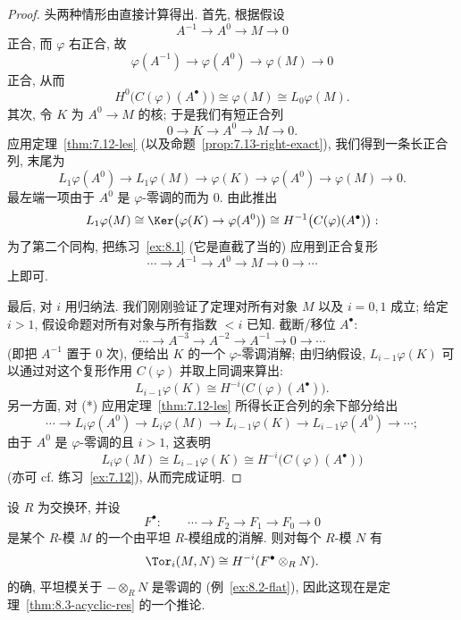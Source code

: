 \begin{proof}
头两种情形由直接计算得出. 首先, 根据假设
\[
A^{-1}\longrightarrow A^0\longrightarrow M\longrightarrow 0
\]
正合, 而 $\varphi$ 右正合, 故
\[
\varphi(A^{-1})\longrightarrow \varphi(A^0)\longrightarrow \varphi(M)\longrightarrow 0
\]
正合, 从而
\[
H^0\bigl(C(\varphi)(A^\bullet)\bigr)\cong \varphi(M)\cong L_0\varphi(M).
\]
其次, 令 $K$ 为 $A^0\to M$ 的核; 于是我们有短正合列
\begin{equation*}
0\longrightarrow K\longrightarrow A^0\longrightarrow M\longrightarrow 0.\tag{*}
\end{equation*}
应用定理~\ref{thm:7.12-les} (以及命题~\ref{prop:7.13-right-exact}), 我们得到一条长正合列, 末尾为
\[
L_1\varphi(A^0)\longrightarrow L_1\varphi(M)\longrightarrow \varphi(K)\longrightarrow \varphi(A^0)\longrightarrow \varphi(M)\longrightarrow 0.
\]
最左端一项由于 $A^0$ 是 $\varphi$-零调的而为 $0$. 由此推出
\[
L_1\varphi(M)\cong \Ker\bigl(\varphi(K)\to \varphi(A^0)\bigr)\cong H^{-1}\bigl(C(\varphi)(A^\bullet)\bigr):
\]
为了第二个同构, 把练习~\ref{ex:8.1} (它是直截了当的) 应用到正合复形
\[
\cdots \longrightarrow A^{-1}\longrightarrow A^0\longrightarrow M\longrightarrow 0\longrightarrow \cdots
\]
上即可.

最后, 对 $i$ 用归纳法. 我们刚刚验证了定理对所有对象 $M$ 以及 $i=0,1$ 成立; 给定 $i>1$, 假设命题对所有对象与所有指数 $<i$ 已知. 截断/移位 $A^\bullet$:
\[
\cdots \longrightarrow A^{-3}\longrightarrow A^{-2}\longrightarrow A^{-1}\longrightarrow 0\longrightarrow \cdots
\]
(即把 $A^{-1}$ 置于 0 次), 便给出 $K$ 的一个 $\varphi$-零调消解; 由归纳假设, $L_{i-1}\varphi(K)$ 可以通过对这个复形作用 $C(\varphi)$ 并取上同调来算出:
\[
L_{i-1}\varphi(K)\cong H^{-i}\bigl(C(\varphi)(A^\bullet)\bigr).
\]
另一方面, 对 (*) 应用定理~\ref{thm:7.12-les} 所得长正合列的余下部分给出
\[
\cdots \longrightarrow L_i\varphi(A^0)\longrightarrow L_i\varphi(M)\longrightarrow L_{i-1}\varphi(K)\longrightarrow L_{i-1}\varphi(A^0)\longrightarrow \cdots;
\]
由于 $A^0$ 是 $\varphi$-零调的且 $i>1$, 这表明
\[
L_i\varphi(M)\cong L_{i-1}\varphi(K)\cong H^{-i}\bigl(C(\varphi)(A^\bullet)\bigr)
\]
(亦可 cf. 练习~\ref{ex:7.12}), 从而完成证明.
\end{proof}

\begin{example}\label{ex:8.4-flat}
设 $R$ 为交换环, 并设
\[
F^\bullet:\qquad \cdots \longrightarrow F_2\longrightarrow F_1\longrightarrow F_0\longrightarrow 0
\]
是某个 $R$-模 $M$ 的一个由平坦 $R$-模组成的消解. 则对每个 $R$-模 $N$ 有
\[
\Tor_i(M,N)\cong H^{-i}(F^\bullet\otimes_R N).
\]
的确, 平坦模关于 $-\otimes_R N$ 是零调的 (例~\ref{ex:8.2-flat}), 因此这现在是定理~\ref{thm:8.3-acyclic-res} 的一个推论.
\end{example}

